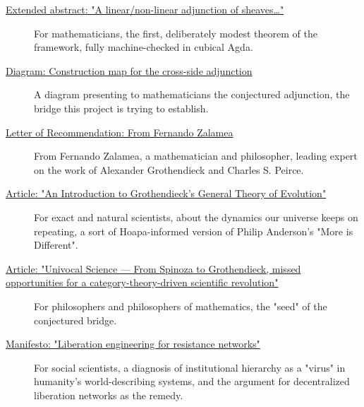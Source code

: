 \documentclass[11pt]{article}
\begin{document}
\begin{description}

\item[\href{https://codeberg.org/doc2cog/hoapa/src/branch/main/communication/linear_nonlinear_adjunction_abstract.pdf}{Extended abstract: "A linear/non-linear adjunction of sheaves\ldots{}"}]
For mathematicians, the first, deliberately modest theorem of the framework, fully machine-checked in cubical Agda.

\item[\href{https://codeberg.org/doc2cog/hoapa/src/branch/main/communication/adjunction_diagram.png}{Diagram: Construction map for the cross-side adjunction}]
A diagram presenting to mathematicians the conjectured adjunction, the bridge this project is trying to establish.

\item[\href{https://codeberg.org/doc2cog/hoapa/src/branch/main/communication/reference_zalamea.pdf}{Letter of Recommendation: From Fernando Zalamea}]
From Fernando Zalamea, a mathematician and philosopher, leading expert on the work of Alexander Grothendieck and Charles S. Peirce.

\item[\href{https://codeberg.org/doc2cog/hoapa/src/branch/main/communication/general_evolution.pdf}{Article: "An Introduction to Grothendieck’s General Theory of Evolution"}]
For exact and natural scientists, about the dynamics our universe keeps on repeating, a sort of Hoapa-informed version of Philip Anderson's "More is Different".

\item[\href{https://codeberg.org/doc2cog/hoapa/src/branch/main/communication/univocal_science.pdf}{Article: "Univocal Science --- From Spinoza to Grothendieck, missed opportunities for a category-theory-driven scientific revolution"}]
For philosophers and philosophers of mathematics, the "seed" of the conjectured bridge.

\item[\href{https://codeberg.org/doc2cog/hoapa/src/branch/main/communication/liberation_engineering.pdf}{Manifesto: "Liberation engineering for resistance networks"}]
For social scientists, a diagnosis of institutional hierarchy as a "virus" in humanity's world-describing systems, and the argument for decentralized liberation networks as the remedy.

\end{description}
\end{document}
